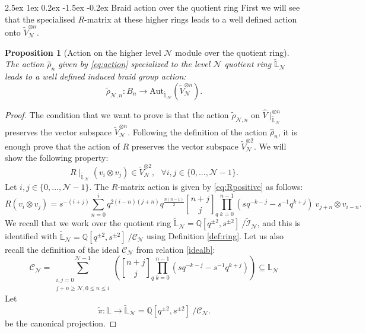\documentclass[reqno,a4paper,11pt]{amsart}
\makeatletter
\numberwithin{equation}{section}
\numberwithin{figure}{section}
\theoremstyle{definition}
\theoremstyle{plain}
\newtheorem{prop}[defn]{Proposition}
\renewcommand*{\subsection}{\@startsection{subsection}{2}{\z@}%
	{2.5ex \@plus 1ex \@minus 0.2ex}%
	{-1.5ex \@plus -0.2ex}%
	{\normalfont\normalsize\bfseries}}
\newcommand{\Q}{\mathbb Q}
\newcommand{\Li}{{\mathbb L}}
\newcommand{\Liq}{\mathbb L}
\newcommand{\Aut}{\mathrm{Aut}}
\newcommand{\cC}{\mathcal{C}}
\newcommand{\cI}{\mathcal{I}}
\newcommand{\cN}{\mathcal{N}}
\renewcommand{\geq}{\geqslant}
\renewcommand{\leq}{\leqslant}
\makeatother
\begin{document}
\subsection{Braid action over the quotient ring}\label{action2}
 First we will see that the specialised $R$-matrix at these higher rings leads to a well defined action onto $\widetilde{V}_{\cN}^{\otimes n}$.
%
\begin{prop}[Action on the higher level $\cN$ module over the quotient ring] 
The action $\hat{\rho}_n$ given by \eqref{eq:action} specialized to the level $\cN$ quotient ring $\widetilde\Li_\cN$ leads to a well defined induced braid group action:
$$ \widetilde{\rho}_{\cN,n}  :B_n \rightarrow \Aut_{\widetilde{\Li}_{\cN}} \left( \widetilde{V}_{\cN}^{\otimes n}\right). $$
\end{prop}
%
\begin{proof}
 The condition that we want to prove is that the action $\widetilde{\rho}_{\cN,n}$ on $\hat{V}\mid_{\widetilde{\Li}_\cN}^{\otimes n}$ preserves the vector subspace $\widetilde{V}_{\cN}^{\otimes n}$. 
Following the definition of the action $\hat{\rho}_{n} $, it is enough prove that
the action of $R$ preserves the vector subspace ${\widetilde{V}_{\cN}^{\otimes 2}}$.
%
We will show the following property:
 $$
 R\mid_{\widetilde{\Li}_{\cN}}(v_i\otimes v_j) \in \widetilde{V}_{\cN}^{\otimes 2},  \ \ \ \forall i,j \in \{0,...,\cN-1\}.
 $$
Let $i,j \in \{0,...,\cN-1\}$. 
The $R$-matrix action is given by \eqref{eq:Rpositive} as follows:
%
 \begin{equation*} 
R(v_i\otimes v_j)= s^{-(i+j)} \sum_{n=0}^{i} q^{2(i-n)(j+n)}q^{\frac{n(n-1)}{2}} {n+j \brack j}_q \prod_{k=0}^{n-1}(sq^{-k-j}-s^{-1}q^{k+j}) \ v_{j+n}\otimes v_{i-n}.
 \end{equation*}
 We recall that we work over the quotient ring 
 $\widetilde{\Li}_{\cN}=
\Q[q^{\pm2}, s^{\pm 2}] \ / {\widetilde{\cI}_\cN}$, 
and this is identified with 
$\widetilde{\Li}_{\cN}=
\Q[q^{\pm2}, s^{\pm 2}] \ / {\cC_\cN}$ 
using Definition \ref{def:ring}. 
Let us also recall the definition of the ideal $\cC_\cN$ from relation \eqref{idealb}: 
\begin{equation*}
\cC_\cN= \sum_{\substack{i,j=0 \\ j+n\geq \cN,0\leq  n\leq i}}^{\cN-1}
 \left( {n+j \brack j}_q \prod_{k=0}^{n-1}(sq^{-k-j}-s^{-1}q^{k+j}) \right) \subseteq \Liq_{\cN}
\end{equation*}
%
Let 
$$
\widetilde{\pi}: \Liq \rightarrow \widetilde{\Li}_{\cN}=
\Q[q^{\pm2}, s^{\pm 2}] \ / {\cC_\cN}.
$$ 
be the canonical projection. 

\end{proof}
\end{document}
